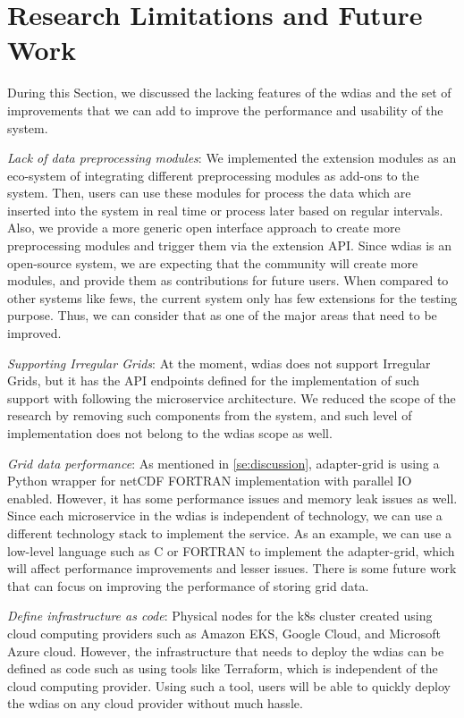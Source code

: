 \section{Research Limitations and Future Work}
\label{se:research_limitations}

During this Section, we discussed the lacking features of the \acrshort{wdias} and the set of improvements that we can add to improve the performance and usability of the system.

\emph{Lack of data preprocessing modules}:
We implemented the extension modules as an eco-system of integrating different preprocessing modules as add-ons to the system. Then, users can use these modules for process the data which are inserted into the system in real time or process later based on regular intervals. Also, we provide a more generic open interface approach to create more preprocessing modules and trigger them via the extension API. Since \acrshort{wdias} is an open-source system, we are expecting that the community will create more modules, and provide them as contributions for future users. When compared to other systems like \acrshort{fews}, the current system only has few extensions for the testing purpose. Thus, we can consider that as one of the major areas that need to be improved.

\emph{Supporting Irregular Grids}:
At the moment, \acrshort{wdias} does not support Irregular Grids, but it has the API endpoints defined for the implementation of such support with following the microservice architecture. We reduced the scope of the research by removing such components from the system, and such level of implementation does not belong to the \acrshort{wdias} scope as well.

\emph{Grid data performance}:
As mentioned in \cref{se:discussion}, adapter-grid is using a Python wrapper for netCDF FORTRAN implementation with parallel IO enabled. However, it has some performance issues and memory leak issues as well. Since each microservice in the \acrshort{wdias} is independent of technology, we can use a different technology stack to implement the service. As an example, we can use a low-level language such as C or FORTRAN to implement the adapter-grid, which will affect performance improvements and lesser issues. There is some future work that can focus on improving the performance of storing grid data.

\emph{Define infrastructure as code}:
Physical nodes for the \acrshort{k8s} cluster created using cloud computing providers such as Amazon EKS, Google Cloud, and Microsoft Azure cloud. However, the infrastructure that needs to deploy the \acrshort{wdias} can be defined as code such as using tools like Terraform, which is independent of the cloud computing provider. Using such a tool, users will be able to quickly deploy the \acrshort{wdias} on any cloud provider without much hassle.

